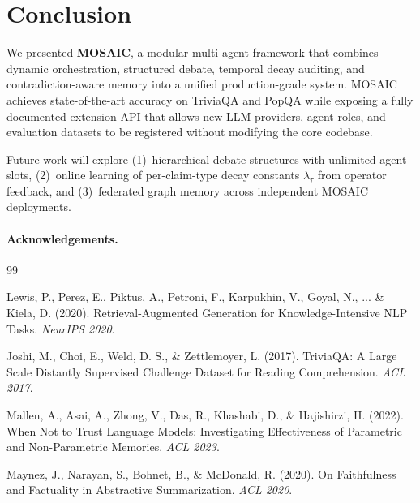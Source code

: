 \documentclass{article}
\begin{document}

\section{Conclusion}
\label{sec:conclusion}

We presented \textbf{MOSAIC}, a modular multi-agent framework that combines
dynamic orchestration, structured debate, temporal decay auditing, and
contradiction-aware memory into a unified production-grade system.  MOSAIC
achieves state-of-the-art accuracy on TriviaQA and PopQA while exposing a
fully documented extension API that allows new LLM providers, agent roles, and
evaluation datasets to be registered without modifying the core codebase.

Future work will explore (1)~hierarchical debate structures with unlimited agent
slots, (2)~online learning of per-claim-type decay constants $\lambda_\tau$ from
operator feedback, and (3)~federated graph memory across independent MOSAIC
deployments.

\paragraph{Acknowledgements.}






\begin{thebibliography}{99}

Lewis, P., Perez, E., Piktus, A., Petroni, F., Karpukhin, V., Goyal, N., ... \& Kiela, D. (2020).
\newblock Retrieval-Augmented Generation for Knowledge-Intensive NLP Tasks.
\newblock \textit{NeurIPS 2020}.

Joshi, M., Choi, E., Weld, D. S., \& Zettlemoyer, L. (2017).
\newblock TriviaQA: A Large Scale Distantly Supervised Challenge Dataset for Reading Comprehension.
\newblock \textit{ACL 2017}.

Mallen, A., Asai, A., Zhong, V., Das, R., Khashabi, D., \& Hajishirzi, H. (2022).
\newblock When Not to Trust Language Models: Investigating Effectiveness of Parametric and Non-Parametric Memories.
\newblock \textit{ACL 2023}.

Maynez, J., Narayan, S., Bohnet, B., \& McDonald, R. (2020).
\newblock On Faithfulness and Factuality in Abstractive Summarization.
\newblock \textit{ACL 2020}.


\end{thebibliography}
\end{document}
